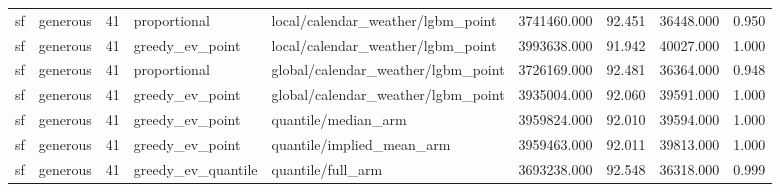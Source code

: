 \begin{tabular}{llrllrrrr}
sf & generous & 41 & proportional & local/calendar\_weather/lgbm\_point & 3741460.000 & 92.451 & 36448.000 & 0.950 \\
sf & generous & 41 & greedy\_ev\_point & local/calendar\_weather/lgbm\_point & 3993638.000 & 91.942 & 40027.000 & 1.000 \\
sf & generous & 41 & proportional & global/calendar\_weather/lgbm\_point & 3726169.000 & 92.481 & 36364.000 & 0.948 \\
sf & generous & 41 & greedy\_ev\_point & global/calendar\_weather/lgbm\_point & 3935004.000 & 92.060 & 39591.000 & 1.000 \\
sf & generous & 41 & greedy\_ev\_point & quantile/median\_arm & 3959824.000 & 92.010 & 39594.000 & 1.000 \\
sf & generous & 41 & greedy\_ev\_point & quantile/implied\_mean\_arm & 3959463.000 & 92.011 & 39813.000 & 1.000 \\
sf & generous & 41 & greedy\_ev\_quantile & quantile/full\_arm & 3693238.000 & 92.548 & 36318.000 & 0.999 \\
\bottomrule
\end{tabular}
